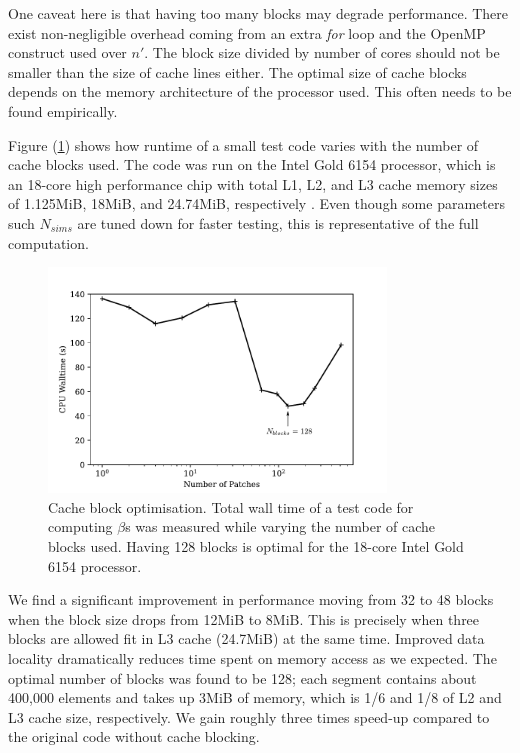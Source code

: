 One caveat here is that having too many blocks may degrade performance. There exist non-negligible overhead coming from an extra \textit{for} loop and the OpenMP construct used over $n'$. The block size divided by number of cores should not be smaller than the size of cache lines either. The optimal size of cache blocks depends on the memory architecture of the processor used. This often needs to be found empirically.

Figure (\ref{fig:cache_block_optimisation}) shows how runtime of a small test code varies with the number of cache blocks used. The code was run on the Intel Gold 6154 processor, which is an 18-core high performance chip with total L1, L2, and L3 cache memory sizes of 1.125MiB, 18MiB, and 24.74MiB, respectively \cite{intel_data_sheet}. Even though some parameters such $N_{sims}$ are tuned down for faster testing, this is representative of the full computation.

\begin{figure}[htbp!] 
	\centering    
	\includegraphics[width=0.8\textwidth]{cache_block_optimisation_annotated.pdf}
	\caption[Cache block optimisation]{Cache block optimisation. Total wall time of a test code for computing $\beta$s was measured while varying the number of cache blocks used. Having 128 blocks is optimal for the 18-core Intel Gold 6154 processor.}
	\label{fig:cache_block_optimisation}
\end{figure}

We find a significant improvement in performance moving from 32 to 48 blocks when the block size drops from 12MiB to 8MiB. This is precisely when three blocks are allowed fit in L3 cache (24.7MiB) at the same time. Improved data locality dramatically reduces time spent on memory access as we expected. The optimal number of blocks was found to be 128; each segment contains about 400,000 elements and takes up 3MiB of memory, which is 1/6 and 1/8 of L2 and L3 cache size, respectively. We gain roughly three times speed-up compared to the original code without cache blocking.

